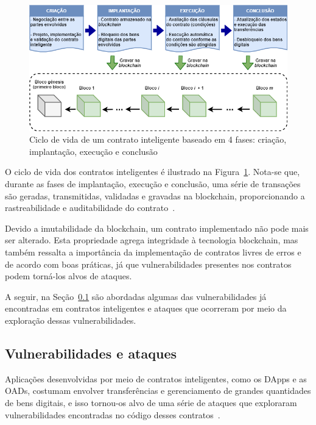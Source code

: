 \begin{figure}[htb]
 \caption{Ciclo de vida de um contrato inteligente baseado em 4 fases: criação, implantação, execução e conclusão}
 \label{fig:contrato-ciclo-de-vida}
 \centering
 \includegraphics[scale=0.6]{figuras/contrato_ciclo_de_vida.png}
\end{figure}

O ciclo de vida dos contratos inteligentes é ilustrado na Figura~\ref{fig:contrato-ciclo-de-vida}. Nota-se que, durante as fases de implantação, execução e conclusão, uma série de transações são geradas, transmitidas, validadas e gravadas na blockchain, proporcionando a rastreabilidade e auditabilidade do contrato~\cite{overview-smartcontracts2020zheng}.

Devido a imutabilidade da blockchain, um contrato implementado não pode mais ser alterado. Esta propriedade agrega integridade à tecnologia blockchain, mas também ressalta a importância da implementação de contratos livres de erros e de acordo com boas práticas, já que vulnerabilidades presentes nos contratos podem torná-los alvos de ataques.

A seguir, na Seção~\ref{tex:fund:ethereum:ataques} são abordadas algumas das vulnerabilidades já encontradas em contratos inteligentes e ataques que ocorreram por meio da exploração dessas vulnerabilidades.  

\subsection{Vulnerabilidades e ataques} \label{tex:fund:ethereum:ataques}

Aplicações desenvolvidas por meio de contratos inteligentes, como os DApps e as OADs, costumam envolver transferências e gerenciamento de grandes quantidades de bens digitais, e isso tornou-os alvo de uma série de ataques que exploraram vulnerabilidades encontradas no código desses contratos~\cite{atzei2017survey-attacks-sok, liu2019survey-ieeeaccess, chen2020survey-ethereum-acm}.

